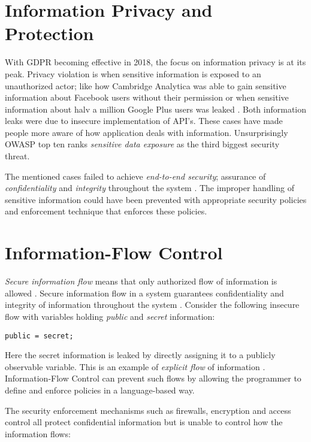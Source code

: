 \section{Information Privacy and Protection}

With GDPR becoming effective in 2018, the focus on information privacy is at its peak. 
Privacy violation is when sensitive information is exposed to an unauthorized actor; like how Cambridge Analytica was able to gain sensitive information about Facebook users without their permission or when sensitive information about halv a million Google Plus users was leaked \cite{cwe} \cite{googleplus} \cite{cambridge}. Both information leaks were due to insecure implementation of API's. These cases have made people more aware of how application deals with information. Unsurprisingly OWASP top ten ranks \emph{sensitive data exposure} as the third biggest security threat\cite{owasp}. 

The mentioned cases failed to achieve \emph{end-to-end security}; assurance of \emph{confidentiality} and \emph{integrity} throughout the system \cite{Sabelfeld2003}. The improper handling of sensitive information could have been prevented with appropriate security policies and enforcement technique that enforces these policies.



\section{Information-Flow Control} 
\emph{Secure information flow} means that only authorized flow of information is allowed \cite{Denning1976}. Secure information flow in a system guarantees confidentiality and integrity of information throughout the system \cite{Hedin2011}. Consider the following insecure flow with variables holding \emph{public} and \emph{secret} information: 

\begin{lstlisting}
public = secret;
\end{lstlisting}

Here the secret information is leaked by directly assigning it to a publicly observable variable. This is an example of \emph{explicit flow} of information \cite{Hedin2011}. Information-Flow Control can prevent such flows by allowing the programmer to define and enforce policies in a language-based way\cite{Sabelfeld2003}. 

The security enforcement mechanisms such as firewalls, encryption and access control all protect confidential information but is unable to control how the information flows:

